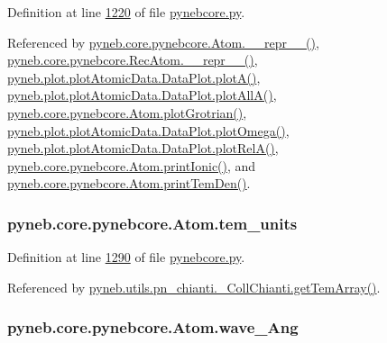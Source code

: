 Definition at line \hyperlink{pynebcore_8py_source_l01220}{1220} of file \hyperlink{pynebcore_8py_source}{pynebcore.\-py}.



Referenced by \hyperlink{pynebcore_8py_source_l02615}{pyneb.\-core.\-pynebcore.\-Atom.\-\_\-\-\_\-repr\-\_\-\-\_\-()}, \hyperlink{pynebcore_8py_source_l03154}{pyneb.\-core.\-pynebcore.\-Rec\-Atom.\-\_\-\-\_\-repr\-\_\-\-\_\-()}, \hyperlink{plot_atomic_data_8py_source_l00117}{pyneb.\-plot.\-plot\-Atomic\-Data.\-Data\-Plot.\-plot\-A()}, \hyperlink{plot_atomic_data_8py_source_l00189}{pyneb.\-plot.\-plot\-Atomic\-Data.\-Data\-Plot.\-plot\-All\-A()}, \hyperlink{pynebcore_8py_source_l02443}{pyneb.\-core.\-pynebcore.\-Atom.\-plot\-Grotrian()}, \hyperlink{plot_atomic_data_8py_source_l00373}{pyneb.\-plot.\-plot\-Atomic\-Data.\-Data\-Plot.\-plot\-Omega()}, \hyperlink{plot_atomic_data_8py_source_l00262}{pyneb.\-plot.\-plot\-Atomic\-Data.\-Data\-Plot.\-plot\-Rel\-A()}, \hyperlink{pynebcore_8py_source_l02233}{pyneb.\-core.\-pynebcore.\-Atom.\-print\-Ionic()}, and \hyperlink{pynebcore_8py_source_l02324}{pyneb.\-core.\-pynebcore.\-Atom.\-print\-Tem\-Den()}.

\hypertarget{classpyneb_1_1core_1_1pynebcore_1_1_atom_a218d09913e06d074a86466946eb221f5}{
\subsubsection[{tem\-\_\-units}]{\setlength{\rightskip}{0pt plus 5cm}pyneb.\-core.\-pynebcore.\-Atom.\-tem\-\_\-units}}\label{classpyneb_1_1core_1_1pynebcore_1_1_atom_a218d09913e06d074a86466946eb221f5}


Definition at line \hyperlink{pynebcore_8py_source_l01290}{1290} of file \hyperlink{pynebcore_8py_source}{pynebcore.\-py}.



Referenced by \hyperlink{pn__chianti_8py_source_l00551}{pyneb.\-utils.\-pn\-\_\-chianti.\-\_\-\-Coll\-Chianti.\-get\-Tem\-Array()}.

\hypertarget{classpyneb_1_1core_1_1pynebcore_1_1_atom_a044e1349bb63766a5f3d25fbf04b5c2c}{
\subsubsection[{wave\-\_\-\-Ang}]{\setlength{\rightskip}{0pt plus 5cm}pyneb.\-core.\-pynebcore.\-Atom.\-wave\-\_\-\-Ang}}\label{classpyneb_1_1core_1_1pynebcore_1_1_atom_a044e1349bb63766a5f3d25fbf04b5c2c}


